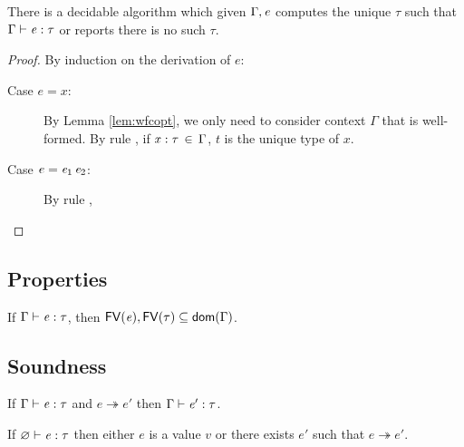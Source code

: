 \begin{lem}
	There is a decidable algorithm which given $\Gamma, \mathit{e}$ computes the unique $\tau$ such that $\Gamma  \vdash  \mathit{e}  :  \tau$ or reports there is no such $\tau$.
\end{lem}

\begin{proof}
	By induction on the derivation of $e$:
	\begin{description}
		\item[Case $e=x$:] By Lemma \ref{lem:wfcopt}, we only need to consider context $\Gamma$ that is well-formed. By rule , if $\mathit{x}  :  \tau \, \in \, \Gamma$, $t$ is the unique type of $x$.
		\item[Case $e=\mathit{e_{{\mathrm{1}}}} \, \mathit{e_{{\mathrm{2}}}}$:] By rule , 
	\end{description} 
\end{proof}

\subsection{Properties}
\newcommand{\FV}{\mathsf{FV}}
\newcommand{\dom}{\mathsf{dom}}

\begin{lem}
If $\Gamma  \vdash  \mathit{e}  :  \tau$, then $\FV(\ottnt{e}),\FV(\tau) \subseteq \dom(\Gamma)$.
\end{lem}

\begin{lem}
	
\end{lem}

\begin{lem}

\end{lem}

\subsection{Soundness}
\begin{lem}
If $\Gamma  \vdash  \mathit{e}  :  \tau$ and $e  \twoheadrightarrow  e'$ then $\Gamma  \vdash  \mathit{e'}  :  \tau$.
\end{lem}

\begin{lem}[Progress]
If $\varnothing  \vdash  \mathit{e}  :  \tau$ then either $e$ is a value $v$ or there exists $e'$ such that $e  \twoheadrightarrow  e'$.
\end{lem}


